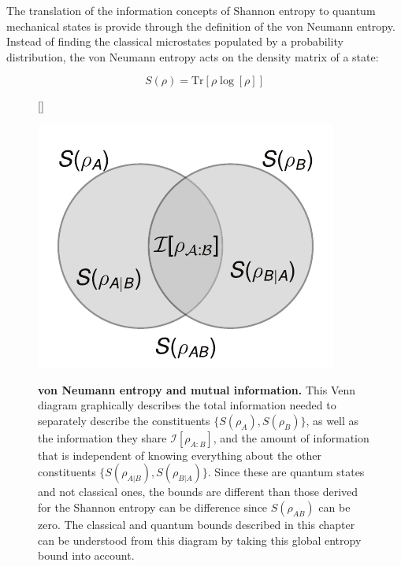 
The translation of the information concepts of Shannon entropy to quantum mechanical states is provide through the definition of the von Neumann entropy. Instead of finding the classical microstates populated by a probability distribution, the von Neumann entropy acts on the density matrix of a state:

\begin{equation}
\label{eqn:svn}
S(\rho) = \mathrm{Tr} \left [ \rho \log[\rho] \right ]
\end{equation}

\begin{figure}
[\FBwidth]
{\caption{\textbf{von Neumann entropy and mutual information.} This Venn diagram graphically describes the total information needed to separately describe the constituents $\{ S(\rho_A), S(\rho_B) \}$, as well as the information they share $\mathcal{I}[\rho_{A:B}]$, and the amount of information that is independent of knowing everything about the other constituents $\{ S(\rho_{A|B}),S(\rho_{B|A})  \}$. Since these are quantum states and not classical ones, the bounds are different than those derived for the Shannon entropy can be difference since $S(\rho_{AB})$ can be zero.\cite{Cerf1996,Horodecki1996,Horodecki2007} The classical  and quantum bounds described in this chapter can be understood from this diagram by taking this global entropy bound into account.} \label{fig:Sven}}
{\includegraphics[width=3 in]{figures/ch3/ven_diag_quantum.pdf} } 
\end{figure}

